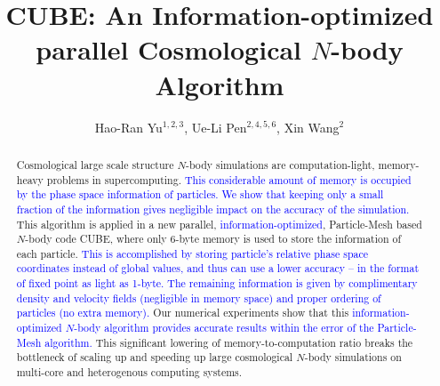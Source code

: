 \documentclass[10pt,twocolumn,preprint]{emulateapj}
\newcommand{\tcb}{\textcolor{blue}}
\begin{document}
\title{CUBE: An Information-optimized parallel Cosmological $N$-body Algorithm}
\author{
Hao-Ran Yu$^{1,2,3}$,
Ue-Li Pen$^{2,4,5,6}$,
Xin Wang$^{2}$
}


 
\begin{abstract}
Cosmological large scale structure $N$-body simulations are computation-light, memory-heavy problems in supercomputing. \tcb{This considerable amount of memory is occupied by the phase space information of particles. We show that keeping only a small fraction of the information gives negligible impact on the accuracy of the simulation.} This algorithm is applied in a new parallel, \tcb{information-optimized}, Particle-Mesh based $N$-body code CUBE, where only 6-byte memory is used to store the information of each particle. \tcb{This is accomplished by storing particle's relative phase space coordinates instead of global values, and thus can use a lower accuracy -- in the format of fixed point as light as 1-byte. The remaining information is given by complimentary density and velocity fields (negligible in memory space) and proper ordering of particles (no extra memory).} Our numerical experiments show that this \tcb{information-optimized $N$-body algorithm provides accurate results within the error of the Particle-Mesh algorithm.} This significant lowering of memory-to-computation ratio breaks the bottleneck of scaling up and speeding up large cosmological $N$-body simulations on multi-core and heterogenous computing systems.

\end{abstract}

\keywords{}
\end{document}
